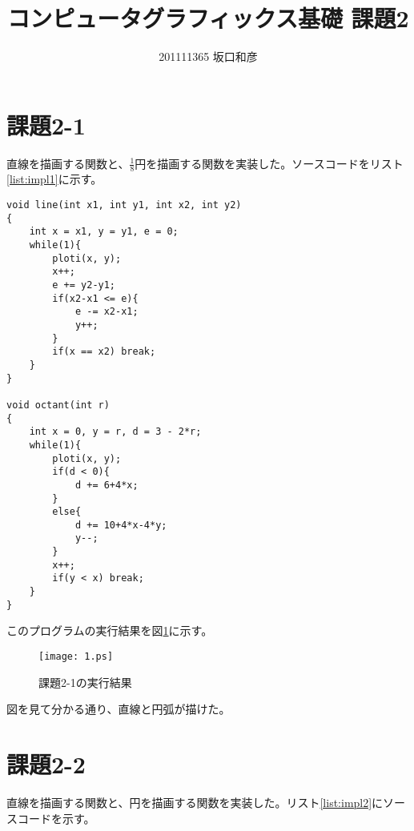\documentclass[titlepage]{jsarticle}
\title{コンピュータグラフィックス基礎 課題2}
\author{201111365 坂口和彦}
\begin{document}
\maketitle

\section{課題2-1}

直線を描画する関数と、$\frac{1}{8}$円を描画する関数を実装した。ソースコードをリスト\ref{list:impl1}に示す。

\begin{lstlisting}[style=program, label=list:impl1, caption=課題2-1のソースコード]
void line(int x1, int y1, int x2, int y2)
{
    int x = x1, y = y1, e = 0;
    while(1){
        ploti(x, y);
        x++;
        e += y2-y1;
        if(x2-x1 <= e){
            e -= x2-x1;
            y++;
        }
        if(x == x2) break;
    }
}

void octant(int r)
{
    int x = 0, y = r, d = 3 - 2*r;
    while(1){
        ploti(x, y);
        if(d < 0){
            d += 6+4*x;
        }
        else{
            d += 10+4*x-4*y;
            y--;
        }
        x++;
        if(y < x) break;
    }
}
\end{lstlisting}

このプログラムの実行結果を図\ref{fig:output1}に示す。

\begin{figure}[htbp]
\begin{center}
\texttt{[image: 1.ps]}
\end{center}
\caption{課題2-1の実行結果}
\label{fig:output1}
\end{figure}

図を見て分かる通り、直線と円弧が描けた。

\section{課題2-2}

直線を描画する関数と、円を描画する関数を実装した。リスト\ref{list:impl2}にソースコードを示す。
\end{document}
